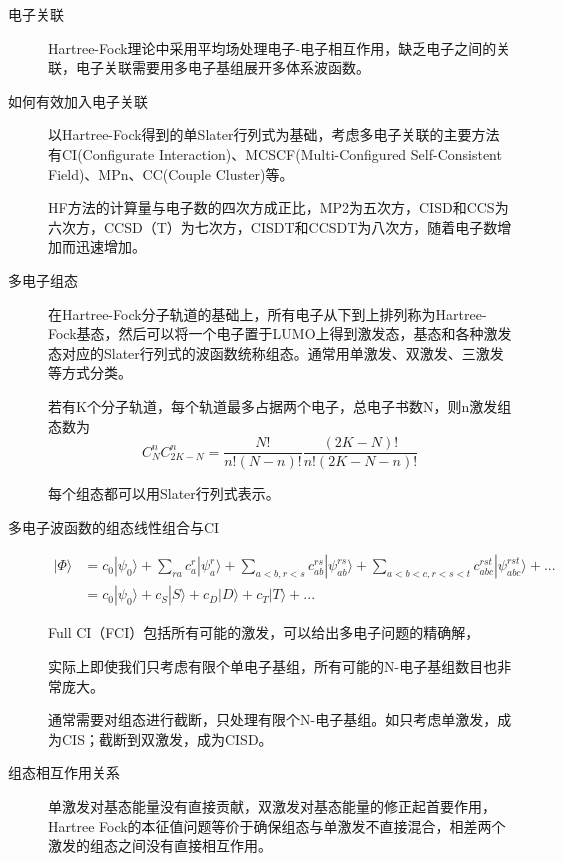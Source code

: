 \documentclass[12pt,a4paper,openany,twoside]{book}
\numberwithin{equation}{section}
\newcommand{\ket}[1]{| #1 \rangle}
\begin{document}
  \begin{description}
    \item[电子关联] Hartree-Fock理论中采用平均场处理电子-电子相互作用，缺乏电子之间的关联，电子关联需要用多电子基组展开多体系波函数。
  
    \item[如何有效加入电子关联] 以Hartree-Fock得到的单Slater行列式为基础，考虑多电子关联的主要方法有CI(Configurate Interaction)、MCSCF(Multi-Configured Self-Consistent Field)、MPn、CC(Couple Cluster)等。
  
    HF方法的计算量与电子数的四次方成正比，MP2为五次方，CISD和CCS为六次方，CCSD（T）为七次方，CISDT和CCSDT为八次方，随着电子数增加而迅速增加。
  
    \item[多电子组态] 在Hartree-Fock分子轨道的基础上，所有电子从下到上排列称为Hartree-Fock基态，然后可以将一个电子置于LUMO上得到激发态，基态和各种激发态对应的Slater行列式的波函数统称组态。通常用单激发、双激发、三激发等方式分类。
  
    若有K个分子轨道，每个轨道最多占据两个电子，总电子书数N，则n激发组态数为
    \begin{equation}
    C_N^nC_{2K-N}^n=\frac{N!}{n!(N-n)!}\frac{(2K-N)!}{n!(2K-N-n)!}
    \end{equation}
  
    每个组态都可以用Slater行列式表示。
  
  
    \item[多电子波函数的组态线性组合与CI]
    \begin{align*}
    \ket{\Phi} &= c_0\ket{\psi_0} +\sum_{ra}c_a^r\ket{\psi_a^r}+\sum_{a<b,r<s}c_{ab}^{rs}\ket{\psi_{ab}^{rs}}+\sum_{a<b<c,r<s<t}c^{rst}_{abc}\ket{\psi^{rst}_{abc}}+...\\
    &=c_0\ket{\psi_0} + c_S\ket{S}+c_D\ket{D}+c_T\ket{T}+...
    \end{align*}
  
    Full CI（FCI）包括所有可能的激发，可以给出多电子问题的精确解，
  
    实际上即使我们只考虑有限个单电子基组，所有可能的N-电子基组数目也非常庞大。
  
    通常需要对组态进行截断，只处理有限个N-电子基组。如只考虑单激发，成为CIS；截断到双激发，成为CISD。
  
  
    \item[组态相互作用关系] 单激发对基态能量没有直接贡献，双激发对基态能量的修正起首要作用，Hartree Fock的本征值问题等价于确保组态与单激发不直接混合，相差两个激发的组态之间没有直接相互作用。
  

\end{description}
\end{document}

